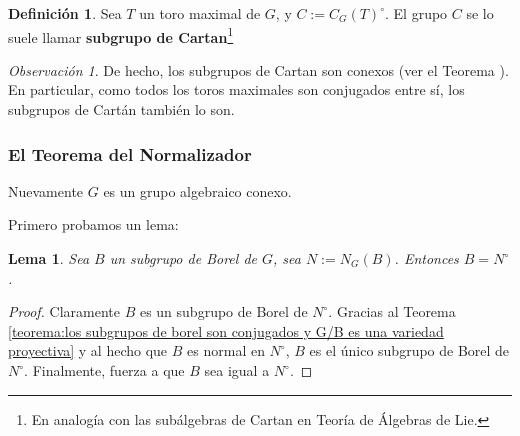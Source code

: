 \documentclass[spanish,10pt]{amsart}
\newtheorem{lemma}[theorem]{Lema}
\theoremstyle{definition}
\newtheorem{definition}[theorem]{Definición}
\theoremstyle{remark}
\newtheorem{remark}[theorem]{Observación}
\numberwithin{equation}{section}
\begin{document}
\begin{definition}
Sea $T$ un toro maximal de $G$, y $C := C_G (T)^\circ$. El grupo $C$ se lo suele llamar \textbf{subgrupo de Cartan}\footnote{En analogía con las subálgebras de Cartan en Teoría de Álgebras de Lie.}
\end{definition}

\begin{remark}
De hecho, los subgrupos de Cartan son conexos (ver el Teorema \cite[\S 22.3.]{humphreys2012linearAlgebraicGroups}). En particular, como todos los toros maximales son conjugados entre sí, los subgrupos de Cartán también lo son.
\end{remark}


\subsubsection{El Teorema del Normalizador}
Nuevamente $G$ es un grupo algebraico conexo.

Primero probamos un lema:

\begin{lemma}
Sea $B$ un subgrupo de Borel de $G$, sea $N:= N_G(B)$. Entonces $B = N^\circ$.
\end{lemma}
\begin{proof}
Claramente $B$ es un subgrupo de Borel de $N^\circ$. Gracias al Teorema \ref{teorema:los subgrupos de borel son conjugados y G/B es una variedad proyectiva} y al hecho que $B$ es normal en $N^\circ$, $B$ es el único subgrupo de Borel de $N^\circ$. Finalmente, \cite[Teorema de Densidad \S 22.2.]{humphreys2012linearAlgebraicGroups} fuerza a que $B$ sea igual a $N^\circ$.
\end{proof}
\end{document}
